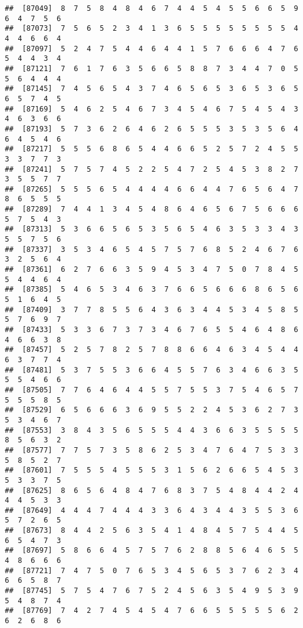 \documentclass[
]{book}
\begin{document}
\begin{verbatim}
##  [87049]  8  7  5  8  4  8  4  6  7  4  4  5  4  5  5  6  6  5  9  6  4  7  5  6
##  [87073]  7  5  6  5  2  3  4  1  3  6  5  5  5  5  5  5  5  5  4  4  4  6  6  4
##  [87097]  5  2  4  7  5  4  4  6  4  4  1  5  7  6  6  6  4  7  6  5  4  4  3  4
##  [87121]  7  6  1  7  6  3  5  6  6  5  8  8  7  3  4  4  7  0  5  5  6  4  4  4
##  [87145]  7  4  5  6  5  4  3  7  4  6  5  6  5  3  6  5  3  6  5  6  5  7  4  5
##  [87169]  5  4  6  2  5  4  6  7  3  4  5  4  6  7  5  4  5  4  3  4  6  3  6  6
##  [87193]  5  7  3  6  2  6  4  6  2  6  5  5  5  3  5  3  5  6  4  6  4  5  4  6
##  [87217]  5  5  5  6  8  6  5  4  4  6  6  5  2  5  7  2  4  5  5  3  3  7  7  3
##  [87241]  5  7  5  7  4  5  2  2  5  4  7  2  5  4  5  3  8  2  7  3  5  5  7  7
##  [87265]  5  5  5  6  5  4  4  4  4  6  6  4  4  7  6  5  6  4  7  8  6  5  5  5
##  [87289]  7  4  4  1  3  4  5  4  8  6  4  6  5  6  7  5  6  6  6  5  7  5  4  3
##  [87313]  5  3  6  6  5  6  5  3  5  6  5  4  6  3  5  3  3  4  3  5  5  7  5  6
##  [87337]  3  5  3  4  6  5  4  5  7  5  7  6  8  5  2  4  6  7  6  3  2  5  6  4
##  [87361]  6  2  7  6  6  3  5  9  4  5  3  4  7  5  0  7  8  4  5  5  4  4  6  4
##  [87385]  5  4  6  5  3  4  6  3  7  6  6  5  6  6  6  8  6  5  6  5  1  6  4  5
##  [87409]  3  7  7  8  5  5  6  4  3  6  3  4  4  5  3  4  5  8  5  5  7  6  9  7
##  [87433]  5  3  3  6  7  3  7  3  4  6  7  6  5  5  4  6  4  8  6  4  6  6  3  8
##  [87457]  5  2  5  7  8  2  5  7  8  8  6  6  4  6  3  4  5  4  4  6  3  7  7  4
##  [87481]  5  3  7  5  5  3  6  6  4  5  5  7  6  3  4  6  6  3  5  5  5  4  6  6
##  [87505]  7  7  6  4  6  4  4  5  5  7  5  5  3  7  5  4  6  5  7  5  5  5  8  5
##  [87529]  6  5  6  6  6  3  6  9  5  5  2  2  4  5  3  6  2  7  3  5  3  4  6  7
##  [87553]  3  8  4  3  5  6  5  5  5  4  4  3  6  6  3  5  5  5  5  8  5  6  3  2
##  [87577]  7  7  5  7  3  5  8  6  2  5  3  4  7  6  4  7  5  3  3  5  8  5  2  7
##  [87601]  7  5  5  5  4  5  5  5  3  1  5  6  2  6  6  5  4  5  3  5  3  3  7  5
##  [87625]  8  6  5  6  4  8  4  7  6  8  3  7  5  4  8  4  4  2  4  4  4  5  3  3
##  [87649]  4  4  4  7  4  4  4  3  3  6  4  3  4  4  3  5  5  3  6  5  7  2  6  5
##  [87673]  8  4  4  2  5  6  3  5  4  1  4  8  4  5  7  5  4  4  5  6  5  4  7  3
##  [87697]  5  8  6  6  4  5  7  5  7  6  2  8  8  5  6  4  6  5  5  4  8  6  6  6
##  [87721]  7  4  7  5  0  7  6  5  3  4  5  6  5  3  7  6  2  3  4  6  6  5  8  7
##  [87745]  5  7  5  4  7  6  7  5  2  4  5  6  3  5  4  9  5  3  9  5  4  8  7  4
##  [87769]  7  4  2  7  4  5  4  5  4  7  6  6  5  5  5  5  5  6  2  6  2  6  8  6

\end{verbatim}
\end{document}
